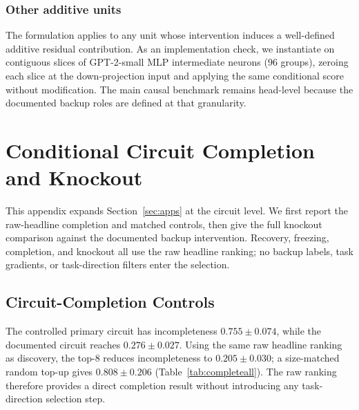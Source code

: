 \subsubsection{Other additive units}
\label{app:ffn}

The formulation applies to any unit whose intervention induces a well-defined additive residual contribution.
As an implementation check, we instantiate \coax on contiguous slices of GPT-2-small MLP intermediate neurons ($96$ groups), zeroing each slice at the down-projection input and applying the same conditional score without modification.
The main causal benchmark remains head-level because the documented backup roles are defined at that granularity.


\clearpage
\section{Conditional Circuit Completion and Knockout}
\label{app:attribution}

This appendix expands Section~\ref{sec:apps} at the circuit level.
We first report the raw-headline \coax completion and matched controls, then give the full knockout comparison against the documented backup intervention.
Recovery, freezing, completion, and knockout all use the raw headline \coax ranking; no backup labels, task gradients, or task-direction filters enter the \coax selection.


\subsection{Circuit-Completion Controls}
\label{app:completeall}

The controlled primary circuit has incompleteness $0.755{\pm}0.074$, while the documented circuit reaches $0.276{\pm}0.027$.
Using the same raw headline ranking as discovery, the \coax top-$8$ reduces incompleteness to $0.205{\pm}0.030$; a size-matched random top-up gives $0.808{\pm}0.206$ (Table~\ref{tab:completeall}).
The raw ranking therefore provides a direct completion result without introducing any task-direction selection step.

